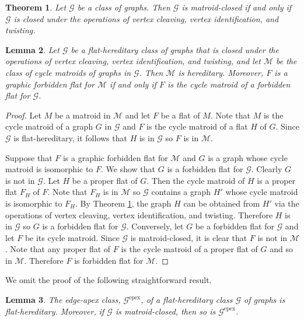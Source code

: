 \documentclass[11pt]{amsart}
\newtheorem{theorem}{Theorem}[section]
\newtheorem{lemma}[theorem]{Lemma}
\theoremstyle{definition}
\theoremstyle{remark}
\numberwithin{equation}{section}
\newcommand\Ga{\mathcal{G}^\mathrm{epex}}
\begin{document}
\begin{theorem}
\label{whitney}
Let $\mathcal{G}$ be a class of graphs. Then $\mathcal{G}$ is matroid-closed if and only if $\mathcal{G}$ is closed under the operations of vertex cleaving, vertex identification, and twisting.
\end{theorem}



\begin{lemma}
\label{error_fixed}
Let $\mathcal{G}$ be a flat-hereditary class of graphs that is closed under the operations of vertex cleaving, vertex identification, and twisting, and let $\mathcal{M}$ be the class of cycle matroids of graphs in $\mathcal{G}$. Then $\mathcal{M}$ is hereditary. Moreover, $F$ is a graphic forbidden flat for $\mathcal{M}$ if and only if $F$ is the cycle matroid of a forbidden flat for $\mathcal{G}$. 
\end{lemma}


\begin{proof}
Let $M$ be a matroid in $\mathcal{M}$ and let $F$ be a flat of $M$. Note that $M$ is the cycle matroid of a graph $G$ in $\mathcal{G}$ and $F$ is the cycle matroid of a flat $H$ of $G$. Since $\mathcal{G}$ is flat-hereditary, it follows that $H$ is in $\mathcal{G}$ so $F$ is in $\mathcal{M}$. 

Suppose that $F$ is a graphic forbidden flat for $\mathcal{M}$ and $G$ is a graph whose cycle matroid is isomorphic to $F$. We show that $G$ is a forbidden flat for $\mathcal{G}$. Clearly $G$ is not in $\mathcal{G}$. Let $H$ be a proper flat of $G$. Then the cycle matroid of $H$ is a proper flat $F_H$ of $F$. Note that $F_H$ is in $\mathcal{M}$ so $\mathcal{G}$ contains a graph $H'$ whose cycle matroid is isomorphic to $F_H$. By Theorem \ref{whitney}, the graph $H$ can be obtained from $H'$ via the operations of vertex cleaving, vertex identification, and twisting. Therefore $H$ is in $\mathcal{G}$ so $G$ is a forbidden flat for $\mathcal{G}$. Conversely, let $G$ be a forbidden flat for $\mathcal{G}$ and let $F$ be its cycle matroid. Since $\mathcal{G}$ is matroid-closed, it is clear that $F$ is not in $\mathcal{M}$. Note that any proper flat of $F$ is the cycle matroid of a proper flat of $G$ and so in $\mathcal{M}$. Therefore $F$ is forbidden flat for $\mathcal{M}$. 
\end{proof}


We omit the proof of the following straightforward result.

\begin{lemma}
\label{hereditary_graph}
The edge-apex class, $\Ga$, of a flat-hereditary class $\mathcal{G}$ of graphs is flat-hereditary. Moreover, if $\mathcal{G}$ is matroid-closed, then so is $\Ga$.
\end{lemma}
\end{document}
